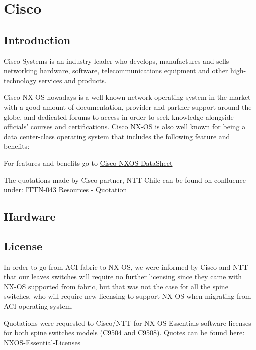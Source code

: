 \section{Cisco}

\subsection{Introduction}

Cisco Systems is an industry leader who develops, manufactures and sells networking hardware, software, telecommunications equipment and other high-technology services and products. 

Cisco NX-OS nowadays is a  well-known network operating system in the market with a good amount of documentation, provider and partner support around the globe, and dedicated forums to access in order to seek knowledge alongside officials’ courses and certifications. Cisco NX-OS is also well known for being a data center-class operating system that includes the following feature and benefits:

For features and benefits go to \href{https://www.cisco.com/c/en/us/products/collateral/ios-nx-os-software/nx-os-software/data_sheet_c78-652063.pdf}{Cisco-NXOS-DataSheet}

The quotations made by Cisco partner, NTT Chile can be found on confluence under: \href{https://confluence.lsstcorp.org/display/IT/ITTN-043+-+Rubin+Network+Re-Engineering}{ITTN-043 Resources - Quotation}

\subsection{Hardware}

\subsection{License}

In order to go from ACI fabric to NX-OS, we were informed by Cisco and NTT that our leaves switches will require no further licensing since they came with NX-OS supported from fabric, but that was not the case for all the spine switches, who will require new licensing to support NX-OS when migrating from ACI operating system.

Quotations were requested to Cisco/NTT for NX-OS Essentials software licenses for both spine switches models (C9504 and C9508). Quotes can be found here: \href{https://confluence.lsstcorp.org/display/IT/ITTN-043+-+Rubin+Network+Re-Engineering?preview=/151855733/156506276/quote_nxos_licenses_march2021.pdf}{NXOS-Essential-Licenses}

